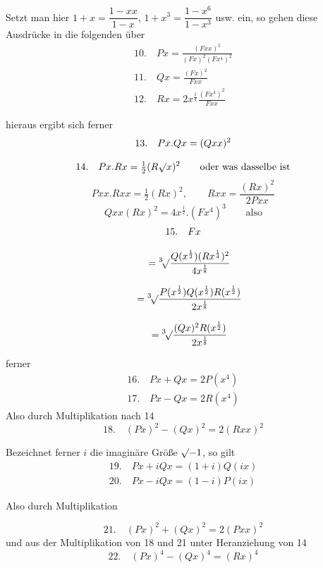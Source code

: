 Setzt man hier $1+x=\dfrac{1-xx}{1-x}$, $1+x^3=\dfrac{1-x^6}{1-x^3}$ usw. ein, so gehen diese Ausdrücke in die folgenden über
\[
\begin{gathered}
10.\quad Px=\frac{(Fxx)^5}{(Fx)^2(Fx^4)^2}\\[8pt]
11.\quad Qx=\frac{(Fx)^2}{Fxx}\\[8pt]
12.\quad Rx=2x^{\frac14}\frac{(Fx^4)^2}{Fxx}
\end{gathered}
\]

hieraus ergibt sich ferner
\[
\begin{gathered}
13.\quad Px.Qx=(Qxx)^2\\[8pt]
14.\quad Px.Rx=\tfrac12(R\mathord{\surd}{x})^2\qquad\text{oder was dasselbe ist}
\end{gathered}
\]
\[
Pxx.Rxx=\tfrac12(Rx)^2,\qquad Rxx=\frac{(Rx)^2}{2Pxx}
\]
\[
Qxx(Rx)^2=4x^{\frac12}.(Fx^4)^3\qquad\text{also}
\]
\[
\begin{gathered}15.\quad Fx\\[8pt]\quad{}=\mathord{{}^{3}\!\surd}{\frac{Q(x^{\frac12})(Rx^{\frac14})^2}{4x^{\frac18}}}
\\[8pt]\quad{}=\mathord{{}^{3}\!\surd}{\frac{P(x^{\frac12})Q(x^{\frac12})R(x^{\frac12})}{2x^{\frac18}}}
\\[8pt]\quad{}=\mathord{{}^{3}\!\surd}{\frac{(Qx)^2R(x^{\frac12})}{2x^{\frac18}}}\end{gathered}
\]

ferner
\[
\begin{gathered}
16.\quad Px+Qx=2P(x^4)\\[8pt]
17.\quad Px-Qx=2R(x^4)
\end{gathered}
\]
Also durch Multiplikation nach 14
\[
18.\quad (Px)^2-(Qx)^2=2(Rxx)^2
\]

Bezeichnet ferner $i$ die imaginäre Größe $\mathord{\surd}{-1}$, so gilt
\[
\begin{gathered}
19.\quad Px+iQx=(1+i)Q(ix)\\[8pt]
20.\quad Px-iQx=(1-i)P(ix)
\end{gathered}
\]

Also durch Multiplikation


\[
21.\quad (Px)^2+(Qx)^2=2(Pxx)^2
\]
und aus der Multiplikation von 18 und 21 unter Heranziehung von 14
\[
22.\quad (Px)^4-(Qx)^4=(Rx)^4
\]

